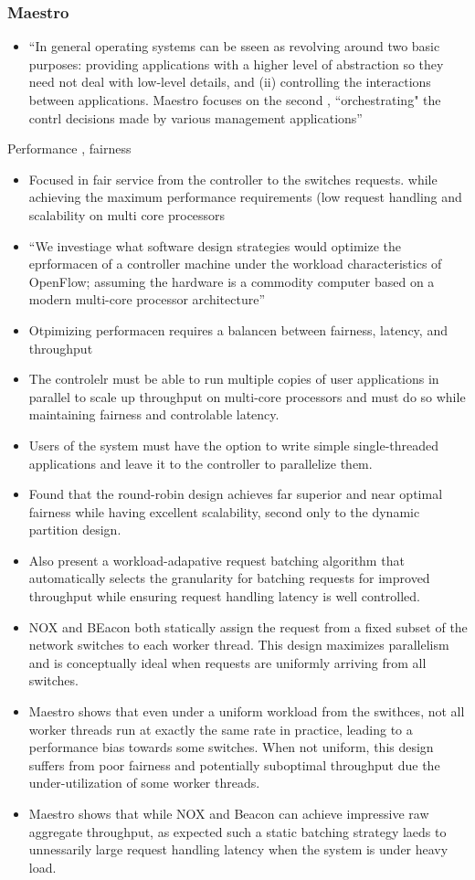 \begin{itemize}
\subsubsection{Maestro}
\begin{itemize}
\item ``In general operating systems can be sseen as revolving around two basic purposes: providing applications with a higher level of abstraction so they need not deal with low-level details, and (ii) controlling the interactions between applications. Maestro focuses on the second , ``orchestrating" the contrl decisions made by various management applications''
\end{itemize}

Performance , fairness 
\begin{itemize}
\item Focused in fair service from the controller to the switches requests. while achieving the maximum performance requirements (low request handling and scalability on multi core processors
\item ``We investiage what software design strategies would optimize the eprformacen of a controller machine under the workload characteristics of OpenFlow; assuming the hardware is a commodity computer based on a modern multi-core processor architecture''
\item Otpimizing performacen requires a balancen between fairness, latency, and throughput 
\item The controlelr must be able to run multiple copies of user applications in parallel to scale up throughput on multi-core processors and must do so while maintaining fairness and controlable latency.
\item Users of the system must have the option to write simple single-threaded applications and leave it to the controller to parallelize them. 
\item Found that the round-robin design achieves far superior and near optimal fairness while having excellent scalability, second only to the dynamic partition design. 
\item Also present a workload-adapative request batching algorithm that automatically selects the granularity for batching requests for improved throughput while ensuring request handling latency is well controlled. 
\item NOX and BEacon both statically assign the request from a fixed subset of the network switches to each worker thread. This design maximizes parallelism and is conceptually ideal when requests are uniformly arriving from all switches. 
\item Maestro shows that even under a uniform workload from the swithces, not all worker threads run at exactly the same rate in practice, leading to a performance bias towards some switches. When not uniform, this design suffers from poor fairness and potentially suboptimal throughput due the under-utilization of some worker threads. 
\item Maestro shows that while NOX and Beacon can achieve impressive raw aggregate throughput, as expected such a static batching strategy laeds to unnessarily large request handling latency when the system is under heavy load. 



\end{itemize}
\end{itemize}
